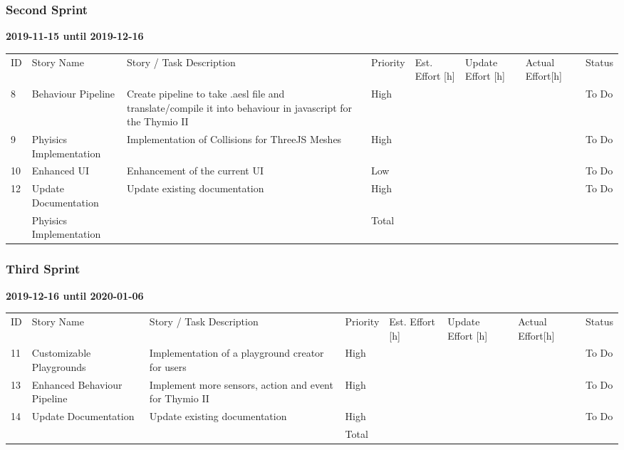 \documentclass{scrartcl}
\begin{document}
\subsubsection{Second Sprint}
\textbf{2019-11-15 until 2019-12-16}
\begin{longtable}{p{5mm}|p{2cm}|p{4cm}|p{1cm}|p{1cm}|p{1cm}|p{1cm}|p{1cm}}
  ID                     & Story Name & Story / Task Description & Priority & Est. Effort {[}h{]} & Update Effort {[}h{]} & Actual Effort{[}h{]} & Status                \\ 
  8 & Behaviour Pipeline & Create pipeline to take .aesl file and translate/compile it into behaviour in javascript for the Thymio II & High &  &  &  & To Do} \\ 
  9 & Phyisics Implementation & Implementation of Collisions for ThreeJS Meshes & High &  &  &  & To Do} \\
  10 & Enhanced UI & Enhancement of the current UI & Low &  &  &  & To Do} \\ 
  12 & Update Documentation & Update existing documentation & High &  &  &  & To Do} \\ \hline
   & Phyisics Implementation &  & Total &  &  &  & } \\ 
\end{longtable}

\subsubsection{Third Sprint}
\textbf{2019-12-16 until 2020-01-06}
\begin{longtable}{p{5mm}|p{2cm}|p{4cm}|p{1cm}|p{1cm}|p{1cm}|p{1cm}|p{1cm}}
  ID                     & Story Name & Story / Task Description & Priority & Est. Effort {[}h{]} & Update Effort {[}h{]} & Actual Effort{[}h{]} & Status                \\ 
  11 & Customizable Playgrounds & Implementation of a playground creator for users & High &  &  &  & To Do} \\ 
  13 & Enhanced Behaviour Pipeline & Implement more sensors, action and event for Thymio II & High &  &  &  & To Do} \\ 
  14 & Update Documentation & Update existing documentation & High &  &  &  & To Do} \\ \hline
   &  &  & Total &  &  &  & } \\ 
\end{longtable}
\end{document}
